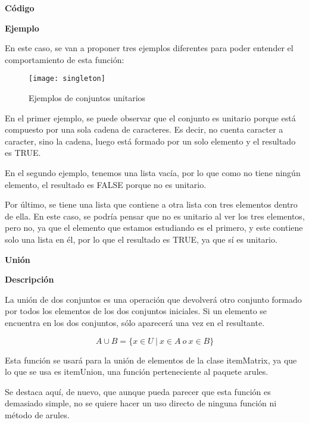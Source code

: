     \textbf{C\'odigo}

    

    \bigskip
    
    \textbf{Ejemplo}

    En este caso, se van a proponer tres ejemplos diferentes para poder entender el comportamiento de esta funci\'on:

    \begin{figure}[H]
        \centering
        \texttt{[image: singleton]}
        \caption{Ejemplos de conjuntos unitarios}
        \label{fig:singleton}
    \end{figure}

    En el primer ejemplo, se puede observar que el conjunto es unitario porque est\'a compuesto por una sola cadena de caracteres. 
    Es decir, no cuenta caracter a caracter, sino la cadena, luego est\'a formado por un solo elemento y el resultado es TRUE.

    En el segundo ejemplo, tenemos una lista vac\'ia, por lo que como no tiene ning\'un elemento, el resultado es FALSE porque no es unitario.

    Por \'ultimo, se tiene una lista que contiene a otra lista con tres elementos dentro de ella. En este caso, se podr\'ia pensar que 
    no es unitario al ver los tres elementos, pero no, ya que el elemento que estamos estudiando es el primero, y este contiene solo una lista 
    en \'el, por lo que el resultado es TRUE, ya que s\'i es unitario.
    \\

    \bigskip


\textbf{ \large Uni\'on}

\smallskip

    \textbf{Descripci\'on}

    La uni\'on de dos conjuntos es una operaci\'on que devolver\'a otro conjunto formado por 
    todos los elementos de los dos conjuntos iniciales. Si un elemento se encuentra en los dos 
    conjuntos, s\'olo aparecer\'a una vez en el resultante.

    \[
    A \cup B = \{x\in U ~ | ~ x\in A ~ o ~ x\in B \}
    \]

    Esta funci\'on se usar\'a para la uni\'on de elementos de la clase itemMatrix, ya que lo que 
    se usa es itemUnion, una funci\'on perteneciente al paquete arules.

    Se destaca aqu\'i, de nuevo, que aunque pueda parecer que esta funci\'on es demasiado simple, 
    no se quiere hacer un uso directo de ninguna funci\'on ni m\'etodo de arules.
    \\


